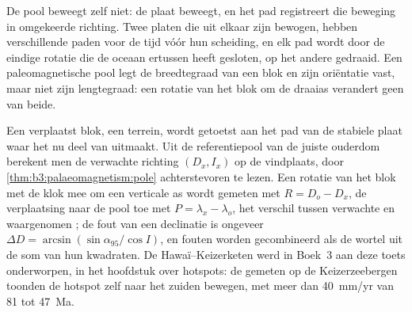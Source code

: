 De pool beweegt zelf niet: de plaat beweegt, en het pad registreert die beweging in
omgekeerde richting. Twee platen die uit elkaar zijn bewogen, hebben verschillende paden voor
de tijd vóór hun scheiding, en elk pad wordt door de eindige rotatie die de oceaan ertussen
heeft gesloten, op het andere gedraaid. Een paleomagnetische pool legt de breedtegraad van een
blok en zijn oriëntatie vast, maar niet zijn lengtegraad: een rotatie van het blok om de
draaias verandert geen van beide.

Een verplaatst blok, een terrein, wordt getoetst aan het pad van de stabiele plaat waar het
nu deel van uitmaakt. Uit de referentiepool van de juiste ouderdom berekent men de verwachte
richting $(D_x, I_x)$ op de vindplaats, door \cref{thm:b3:palaeomagnetism:pole} achterstevoren
te lezen. Een rotatie van het blok met de klok mee om een verticale as wordt gemeten met
$R = D_o - D_x$, de verplaatsing naar de pool toe met $P = \lambda_x -
\lambda_o$, het verschil tussen verwachte en waargenomen ; de
fout van een declinatie is ongeveer $\Delta D = \arcsin(\sin\alpha_{95}/\cos I)$,
en fouten worden gecombineerd als de wortel uit de som van hun kwadraten. De
Hawaï--Keizerketen werd in Boek~3 aan deze toets onderworpen, in het hoofdstuk over hotspots:
de  gemeten op de Keizerzeebergen toonden de hotspot zelf
naar het zuiden bewegen, met meer dan \qty{40}{mm/yr} van 81 tot \qty{47}{Ma}.

